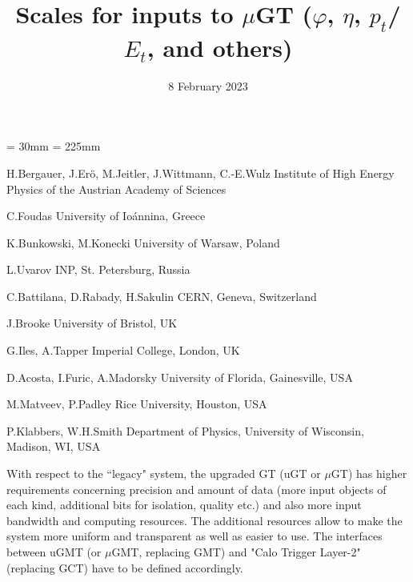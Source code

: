 \documentclass{cmspaper}
\begin{document}
\topmargin = 30mm
\textheight = 225mm

\def\detectornote#1{{Available on CMS information server
\hfill\Large\bf CMS DN #1}
\begin{center}\texttt{[image: cms\_dn.eps]}\end{center}}

\begin{titlepage}

\date{8 February 2023}
\title{Scales for inputs to $\mu$GT
($\varphi$, $\eta$, $p_t$/$E_t$, and others)}

\begin{Authlist}
{H.Bergauer, J.Er\"{o}, M.Jeitler,
J.Wittmann, C.-E.Wulz}
{Institute of High Energy Physics of the Austrian Academy of Sciences}

C.Foudas
{University of Io\'annina, Greece}

K.Bunkowski, M.Konecki
{University of Warsaw, Poland}

L.Uvarov
{INP, St. Petersburg, Russia}

C.Battilana, D.Rabady, H.Sakulin
{CERN, Geneva, Switzerland}

J.Brooke
{University of Bristol, UK}

G.Iles, A.Tapper
{Imperial College, London, UK}


D.Acosta, I.Furic, A.Madorsky
{University of Florida, Gainesville, USA}

M.Matveev, P.Padley
{Rice University, Houston, USA}

P.Klabbers, W.H.Smith
{Department of Physics, University of Wisconsin, Madison, WI, USA }

\end{Authlist}

\end{titlepage}

With respect to the ``legacy" system, the upgraded GT (uGT or $\mu$GT) has higher requirements concerning precision and amount of data (more input objects of each kind, additional bits for isolation, quality etc.) and also more input bandwidth and computing resources. The additional resources  allow to make the system more uniform and transparent as well as easier to use. The interfaces between uGMT (or $\mu$GMT, replacing GMT) and "Calo Trigger Layer-2" (replacing GCT) have to be defined accordingly.
\end{document}
